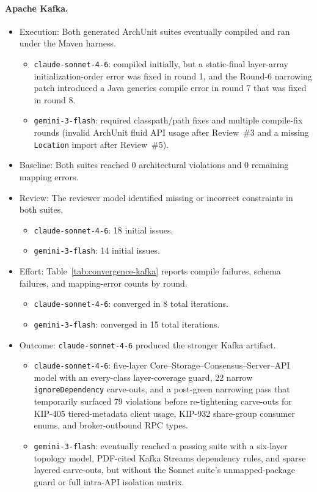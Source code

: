 \documentclass[sigconf,screen]{acmart}
\begin{document}
\paragraph{Apache Kafka.}
\begin{itemize}
    \item Execution: Both generated ArchUnit suites eventually compiled and ran under the Maven harness.
    \begin{itemize}
        \item \texttt{claude-sonnet-4-6}: compiled initially, but a static-final layer-array initialization-order error was fixed in round 1, and the Round-6 narrowing patch introduced a Java generics compile error in round 7 that was fixed in round 8.
        \item \texttt{gemini-3-flash}: required classpath/path fixes and multiple compile-fix rounds (invalid ArchUnit fluid API usage after Review~\#3 and a missing \texttt{Location} import after Review~\#5).
    \end{itemize}
    \item Baseline: Both suites reached 0 architectural violations and 0 remaining mapping errors.
    \item Review: The reviewer model identified missing or incorrect constraints in both suites.
    \begin{itemize}
        \item \texttt{claude-sonnet-4-6}: 18 initial issues.
        \item \texttt{gemini-3-flash}: 14 initial issues.
    \end{itemize}
    \item Effort: Table~\ref{tab:convergence-kafka} reports compile failures, schema failures, and mapping-error counts by round.
    \begin{itemize}
        \item \texttt{claude-sonnet-4-6}: converged in 8 total iterations.
        \item \texttt{gemini-3-flash}: converged in 15 total iterations.
    \end{itemize}
    \item Outcome: \texttt{claude-sonnet-4-6} produced the stronger Kafka artifact.
    \begin{itemize}
        \item \texttt{claude-sonnet-4-6}: five-layer Core--Storage--Consensus--Server--API model with an every-class layer-coverage guard, 22 narrow \texttt{ignoreDependency} carve-outs, and a post-green narrowing pass that temporarily surfaced 79 violations before re-tightening carve-outs for KIP-405 tiered-metadata client usage, KIP-932 share-group consumer enums, and broker-outbound RPC types.
        \item \texttt{gemini-3-flash}: eventually reached a passing suite with a six-layer topology model, PDF-cited Kafka Streams dependency rules, and sparse layered carve-outs, but without the Sonnet suite's unmapped-package guard or full intra-API isolation matrix.
    \end{itemize}
\end{itemize}
\end{document}

